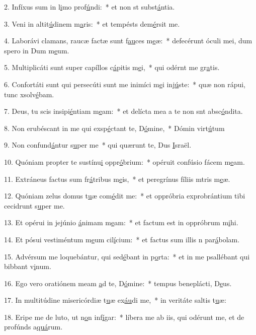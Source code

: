 2. Infíxus sum in l\uline{i}mo prof\uline{ú}ndi:~* et non st subst\uline{á}ntia.\par 
3. Veni in altit\uline{ú}dinem m\uline{a}ris:~* et tempésts dem\uline{é}rsit me.\par 
4. Laborávi clamans, raucæ factæ sunt f\uline{au}ces m\uline{e}æ:~* defecérunt óculi mei, dum spero in Dum m\uline{e}um.\par 
5. Multiplicáti sunt super capíllos c\uline{á}pitis m\uline{e}i,~* qui odérnt me gr\uline{a}tis.\par 
6. Confortáti sunt qui persecúti sunt me inimíci m\uline{e}i inj\uline{ú}ste:~* quæ non rápui, tunc xsolv\uline{é}bam.\par 
7. Deus, tu scis insipi\uline{é}ntiam m\uline{e}am:~* et delícta mea a te non snt absc\uline{ó}ndita.\par 
8. Non erubéscant in me qui exsp\uline{é}ctant te, D\uline{ó}mine,~* Dómin virt\uline{ú}tum\par 
9. Non confund\uline{á}ntur s\uline{u}per me~* qui quærunt te, Dus \uline{I}sraël.\par 
10. Quóniam propter te sustínu\uline{i} oppr\uline{ó}brium:~* opéruit confúsio fácem m\uline{e}am.\par 
11. Extráneus factus sum fr\uline{á}tribus m\uline{e}is,~* et peregrínus fíliis mtris m\uline{e}æ.\par 
12. Quóniam zelus domus t\uline{u}æ com\uline{é}dit me:~* et oppróbria exprobrántium tibi cecidrunt s\uline{u}per me.\par 
13. Et opérui in jejúnio \uline{á}nimam m\uline{e}am:~* et factum est in oppróbrum m\uline{i}hi.\par 
14. Et pósui vestiméntum m\uline{e}um cil\uline{í}cium:~* et factus sum illis n par\uline{á}bolam.\par 
15. Advérsum me loquebántur, qui sed\uline{é}bant in p\uline{o}rta:~* et in me psallébant qui bibbant v\uline{i}num.\par 
16. Ego vero oratiónem meam \uline{a}d te, D\uline{ó}mine:~* tempus beneplácti, D\uline{e}us.\par 
17. In multitúdine misericórdiæ t\uline{u}æ ex\uline{áu}di me,~* in veritáte saltis t\uline{u}æ:\par 
18. Eripe me de luto, ut n\uline{o}n inf\uline{í}gar:~* líbera me ab iis, qui odérunt me, et de profúnds a\uline{quá}rum.\par 
